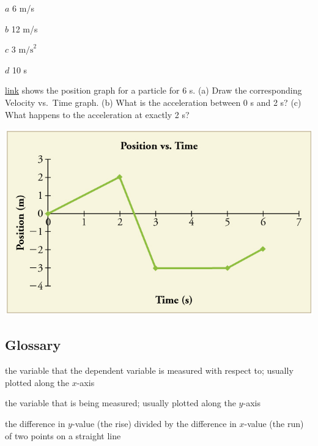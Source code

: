 \documentclass[
]{book}
\providecommand{\tightlist}{%
  \setlength{\itemsep}{0pt}\setlength{\parskip}{0pt}}
\newenvironment{problems-exercises}{}{}
\begin{document}
\begin{problems-exercises}
\leavevmode\hypertarget{fs-id1778256}{}%
\(a\) 6 m/s

\(b\) 12 m/s

\(c\) \(\text{3\ m/s}^{2}{}\)

\(d\) 10 s

\hypertarget{fs-id1582774}{}
\leavevmode\hypertarget{fs-id1598940}{}%
\protect\hyperlink{import-auto-id4035681}{link} shows the
position graph for a particle for 6 s. (a) Draw the corresponding
Velocity vs.~Time graph. (b) What is the acceleration between 0 s and 2
s? (c) What happens to the acceleration at exactly 2 s?

\includegraphics{images/Figure_02_08Sol_21.jpg}

\end{problems-exercises}

\hypertarget{glossary-5}{%
\subsection{Glossary}\label{glossary-5}}

\begin{description}
\tightlist
\item[independent variable]
the variable that the dependent variable is measured with respect
to; usually plotted along the \(x{}\)-axis
\end{description}

\begin{description}
\tightlist
\item[dependent variable]
the variable that is being measured; usually plotted along the
\(y{}\)-axis
\end{description}

\begin{description}
\tightlist
\item[slope]
the difference in \(y{}\)-value (the rise) divided by the difference
in \(x{}\)-value (the run) of two points on a straight line
\end{description}
\end{document}
